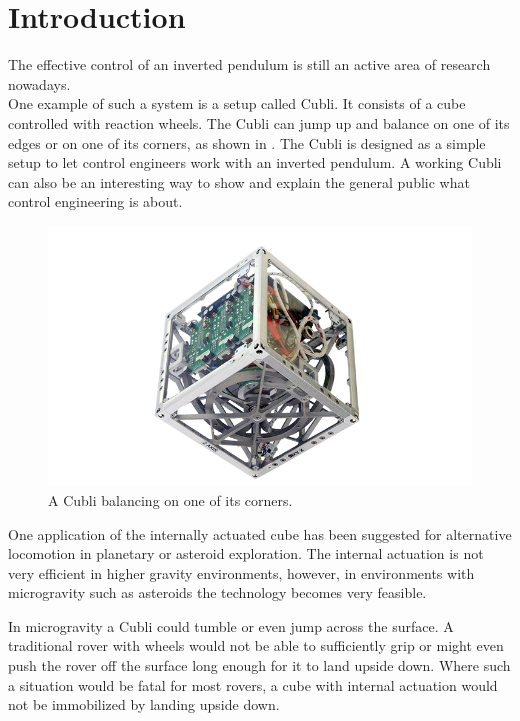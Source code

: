 \chapter{Introduction}\label{introduction}
The effective control of an inverted pendulum is still an active area of research nowadays.\cite{JHuber}\\
One example of such a system is a setup called Cubli. It consists of a cube controlled with reaction wheels. The Cubli can jump up and balance on one of its edges or on one of its corners, as shown in .
The Cubli is designed as a simple setup to let control engineers work with an inverted pendulum. A working Cubli can also be an interesting way to show and explain the general public  what control engineering is about.\cite{MGajamohan}
%
\begin{figure}[H] 
	\centering
	\includegraphics[scale=1.3]{figures/CubliCorner-700x4302}
	\caption{A Cubli balancing on one of its corners.\cite{RAndrea}}
	\label{CubliCorner}
\end{figure}\vspace{-18pt}
%
One application of the internally actuated cube has been suggested for alternative locomotion in planetary or asteroid exploration. The internal actuation is not very efficient in higher gravity environments, however, in environments with microgravity such as asteroids the technology becomes very feasible.\cite{RAllen}

In microgravity a Cubli could tumble or even jump across the surface. A traditional rover with wheels would not be able to sufficiently grip or might even push the rover off the surface long enough for it to land upside down. Where such a situation would be fatal for most rovers, a cube with internal actuation would not be immobilized by landing upside down.\cite{ELandau}

